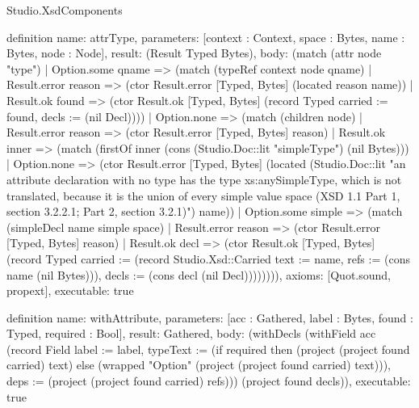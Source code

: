 \begin{lexlean}{Studio.XsdComponents}
\begin{semanticmodule}
definition{
  name: attrType,
  parameters: [context : Context, space : Bytes, name : Bytes, node : Node],
  result: (Result Typed Bytes),
  body: (match (attr node "type")
    | Option.some qname => (match (typeRef context node qname)
      | Result.error reason => (ctor Result.error [Typed, Bytes] (located reason name))
      | Result.ok found => (ctor Result.ok [Typed, Bytes] (record Typed {carried := found, decls := (nil Decl)})))
    | Option.none => (match (children node)
      | Result.error reason => (ctor Result.error [Typed, Bytes] reason)
      | Result.ok inner => (match (firstOf inner (cons (Studio.Doc::lit "simpleType") (nil Bytes)))
        | Option.none => (ctor Result.error [Typed, Bytes] (located (Studio.Doc::lit "an attribute declaration with no type has the type xs:anySimpleType, which is not translated, because it is the union of every simple value space (XSD 1.1 Part 1, section 3.2.2.1; Part 2, section 3.2.1)") name))
        | Option.some simple => (match (simpleDecl name simple space)
          | Result.error reason => (ctor Result.error [Typed, Bytes] reason)
          | Result.ok decl => (ctor Result.ok [Typed, Bytes] (record Typed {carried := (record Studio.Xsd::Carried {text := name, refs := (cons name (nil Bytes))}), decls := (cons decl (nil Decl))})))))),
  axioms: [Quot.sound, propext],
  executable: true
}

definition{
  name: withAttribute,
  parameters: [acc : Gathered, label : Bytes, found : Typed, required : Bool],
  result: Gathered,
  body: (withDecls (withField acc (record Field {label := label, typeText := (if required then (project (project found carried) text) else (wrapped "Option" (project (project found carried) text))), deps := (project (project found carried) refs)})) (project found decls)),
  executable: true
}


\end{semanticmodule}
\end{lexlean}
